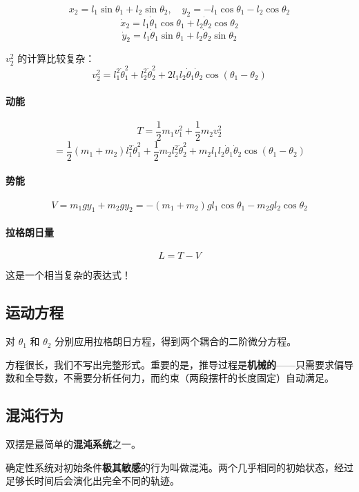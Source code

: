 \[
x_2 = l_1 \sin\theta_1 + l_2 \sin\theta_2, \quad y_2 = -l_1 \cos\theta_1 - l_2 \cos\theta_2
\]
\[
\dot{x}_2 = l_1 \dot{\theta}_1 \cos\theta_1 + l_2 \dot{\theta}_2 \cos\theta_2
\]
\[
\dot{y}_2 = l_1 \dot{\theta}_1 \sin\theta_1 + l_2 \dot{\theta}_2 \sin\theta_2
\]

$v_2^2$ 的计算比较复杂：
\[
v_2^2 = l_1^2 \dot{\theta}_1^2 + l_2^2 \dot{\theta}_2^2 + 2l_1 l_2 \dot{\theta}_1 \dot{\theta}_2 \cos(\theta_1 - \theta_2)
\]

\paragraph{动能}

\[
T = \frac{1}{2}m_1 v_1^2 + \frac{1}{2}m_2 v_2^2
\]
\[
= \frac{1}{2}(m_1 + m_2) l_1^2 \dot{\theta}_1^2 + \frac{1}{2}m_2 l_2^2 \dot{\theta}_2^2 + m_2 l_1 l_2 \dot{\theta}_1 \dot{\theta}_2 \cos(\theta_1 - \theta_2)
\]

\paragraph{势能}

\[
V = m_1 g y_1 + m_2 g y_2 = -(m_1 + m_2) g l_1 \cos\theta_1 - m_2 g l_2 \cos\theta_2
\]

\paragraph{拉格朗日量}

\[
L = T - V
\]

这是一个相当复杂的表达式！

\subsection{运动方程}

对 $\theta_1$ 和 $\theta_2$ 分别应用拉格朗日方程，得到两个耦合的二阶微分方程。

方程很长，我们不写出完整形式。重要的是，推导过程是\textbf{机械的}——只需要求偏导数和全导数，不需要分析任何力，而约束（两段摆杆的长度固定）自动满足。

\subsection{混沌行为}

双摆是最简单的\textbf{混沌系统}之一。

\begin{definition}[混沌]
确定性系统对初始条件\textbf{极其敏感}的行为叫做混沌。两个几乎相同的初始状态，经过足够长时间后会演化出完全不同的轨迹。
\end{definition}

